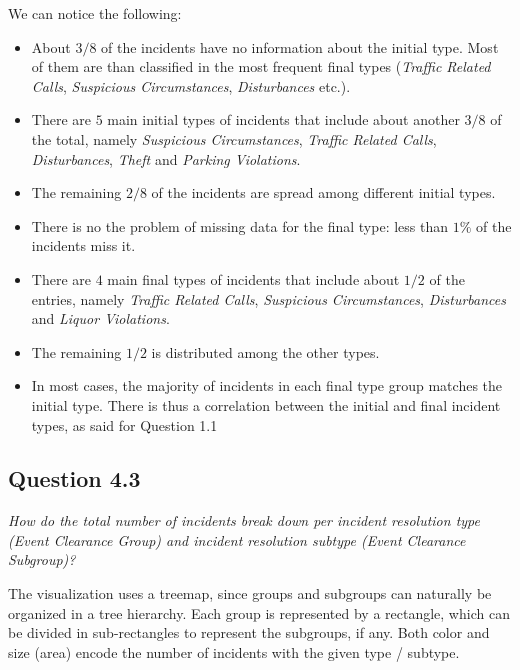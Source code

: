 We can notice the following:
\begin{itemize}
	\item About $3/8$ of the incidents have no information about the initial type. Most of them are than classified in the most frequent final types (\textit{Traffic Related Calls}, \textit{Suspicious Circumstances}, \textit{Disturbances} etc.).
	\item There are $5$ main initial types of incidents that include about another $3/8$ of the total, namely \textit{Suspicious Circumstances}, \textit{Traffic Related Calls}, \textit{Disturbances}, \textit{Theft} and \textit{Parking Violations}.
	\item The remaining $2/8$ of the incidents are spread among different initial types.
	\item There is no the problem of missing data for the final type: less than $1\%$ of the incidents miss it.
	\item There are $4$ main final types of incidents that include about $1/2$ of the entries, namely \textit{Traffic Related Calls}, \textit{Suspicious Circumstances}, \textit{Disturbances} and \textit{Liquor Violations}.
	\item The remaining $1/2$ is distributed among the other types.
	\item In most cases, the majority of incidents in each final type group matches the initial type. There is thus a correlation between the initial and final incident types, as said for Question 1.1
\end{itemize}


\subsection*{Question 4.3}
\textit{How do the total number of incidents break down per incident resolution type (Event Clearance Group) and incident resolution subtype (Event Clearance Subgroup)?}

The visualization uses a treemap, since groups and subgroups can naturally be organized in a tree hierarchy.
Each group is represented by a rectangle, which can be divided in sub-rectangles to represent the subgroups, if any.
Both color and size (area) encode the number of incidents with the given type / subtype.

